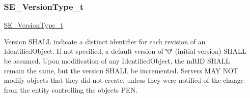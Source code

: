 \subsubsection{\texorpdfstring{S\+E\+\_\+\+Version\+Type\+\_\+t}{SE\_VersionType\_t}}
{\footnotesize\ttfamily \hyperlink{group__VersionType_ga4b8d27838226948397ed99f67d46e2ae}{S\+E\+\_\+\+Version\+Type\+\_\+t}}

Version S\+H\+A\+LL indicate a distinct identifier for each revision of an Identified\+Object. If not specified, a default version of \char`\"{}0\char`\"{} (initial version) S\+H\+A\+LL be assumed. Upon modification of any Identified\+Object, the m\+R\+ID S\+H\+A\+LL remain the same, but the version S\+H\+A\+LL be incremented. Servers M\+AY N\+OT modify objects that they did not create, unless they were notified of the change from the entity controlling the object\textquotesingle{}s P\+EN. 